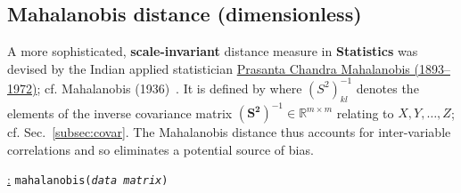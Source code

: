 \subsection*{Mahalanobis distance \hfill (dimensionless)}
A more sophisticated, {\bf scale-invariant} distance measure in 
{\bf Statistics} was devised by the Indian applied statistician 
\href{http://www-history.mcs.st-and.ac.uk/Biographies/Mahalanobis.html}{Prasanta Chandra Mahalanobis (1893--1972)}; cf. Mahalanobis 
(1936)~. It is defined by
%
\be
{}
\ee
%
where $(S^{2})^{-1}_{kl}$ denotes the elements of the inverse
covariance matrix $(\boldsymbol{S^{2}})^{-1} \in
\mathbb{R}^{m \times m}$ relating to $X, Y, \ldots, Z$; cf.
Sec.~\ref{subsec:covar}. The Mahalanobis distance thus accounts for
inter-variable correlations and so eliminates a potential source of
bias.

\medskip
\noindent
\underline{\R:} \texttt{mahalanobis(\textit{data matrix})}

